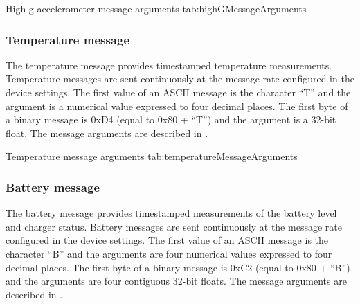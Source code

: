 \begingroup
    \def\tempArgumentA{High-g accelerometer X axis in g}
    \def\tempArgumentB{High-g accelerometer Y axis in g}
    \def\tempArgumentC{High-g accelerometer Z axis in g}
    \dataMessageTable
    {High-g accelerometer message arguments}
    {tab:highGMessageArguments}
\endgroup

\begingroup
    \def\tempNameA{High-g accelerometer X axis}
    \def\tempNameB{High-g accelerometer Y axis}
    \def\tempNameC{High-g accelerometer Z axis}
    \def\tempValueA{0}
    \def\tempValueB{0}
    \def\tempValueC{1}
    \def\tempAsciiFirst{H}
    \def\tempAsciiA{0.0000}
    \def\tempAsciiB{0.0000}
    \def\tempAsciiC{1.0000}
    \def\tempBinaryFirst{C8}
    \def\tempBinaryA{00 00 00 00}
    \def\tempBinaryB{00 00 00 00}
    \def\tempBinaryC{00 00 80 3F}
    \dataMessageExample
\endgroup

\subsubsection{Temperature message}

The temperature message provides timestamped temperature measurements.  Temperature messages are sent continuously at the message rate configured in the device settings.  The first value of an \ac{ASCII} message is the character \enquote{T} and the argument is a numerical value expressed to four decimal places.  The first byte of a binary message is 0xD4 (equal to 0x80 + \enquote{T}) and the argument is a 32-bit float.  The message arguments are described in .

\begingroup
    \def\tempArgumentA{Temperature in degrees Celsius}
    \dataMessageTable
    {Temperature message arguments}
    {tab:temperatureMessageArguments}
\endgroup

\begingroup
    \def\tempNameA{Temperature}
    \def\tempValueA{25}
    \def\tempAsciiFirst{T}
    \def\tempAsciiA{25.0000}
    \def\tempBinaryFirst{D4}
    \def\tempBinaryA{00 00 41 C8}
    \dataMessageExample
\endgroup

\subsubsection{Battery message}

The battery message provides timestamped measurements of the battery level and charger status.  Battery messages are sent continuously at the message rate configured in the device settings.  The first value of an \ac{ASCII} message is the character \enquote{B} and the arguments are four numerical values expressed to four decimal places.  The first byte of a binary message is 0xC2 (equal to 0x80 + \enquote{B}) and the arguments are four contiguous 32-bit floats.  The message arguments are described in .

